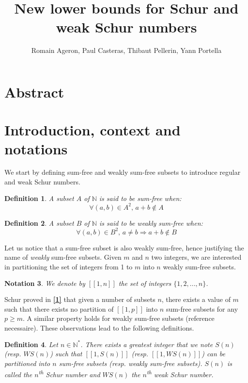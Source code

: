 \documentclass{article}
\title{New lower bounds for Schur and weak Schur numbers}
\author{Romain Ageron, Paul Casteras, Thibaut Pellerin, Yann Portella}
\newtheorem{definition}{Definition}[section]
\newtheorem{notation}[definition]{Notation}
\newtheorem{computational theorem}{Computational Theorem}[section]
\begin{document}
\maketitle

\section{Abstract}



\section{Introduction, context and notations}

We start by defining sum-free and weakly sum-free subsets to introduce regular and weak Schur numbers.

\begin{definition}
A subset \(A\) of \(\mathbb{N}\) is said to be \textit{sum-free} when:
\[ \forall (a,b) \in A^2 \text{, } a+b \notin A\]
\end{definition}

\begin{definition}
A subset \(B\) of \(\mathbb{N}\) is said to be \textit{weakly sum-free} when:
\[ \forall (a,b) \in B^2 \text{, } a \neq b \Longrightarrow a+b \notin B\]
\end{definition}

Let us notice that a sum-free subset is also weakly sum-free, hence justifying the name of \textit{weakly} sum-free
subsets. Given \(m\) and \(n\) two integers, we are interested in partitioning the set of integers from 1 to \(m\) into
\(n\) weakly sum-free subsets.

\begin{notation}
We denote by \([\![1,n]\!]\) the set of integers \(\{1, 2, ..., n\}\).
\end{notation}

Schur proved in \hyperlink{label1}{\textbf{[1]}} that given a number of subsets \(n\), there exists a value of \(m\)
such that there exists no partition of \([\![1,p]\!]\) into \(n\) sum-free subsets for any \(p \geqslant m\). A similar
property holds for weakly sum-free subsets (reference necessaire). These observations lead to the following definitions.

\begin{definition}
Let \(n \in \mathbb{N}^*\). There exists a greatest integer that we note \(S(n)\) (\textit{resp. \(WS(n)\)}) such that
\([\![1,S(n)]\!]\) (resp. \([\![1,WS(n)]\!]\)) can be partitioned into \(n\) sum-free subsets (resp. weakly sum-free
subsets). \(S(n)\) is called the \textit{\(n\)\textsuperscript{th} Schur number} and \textit{\(WS(n)\) the \(n\)\textsuperscript{th} weak
Schur number}.
\end{definition}
\end{document}
